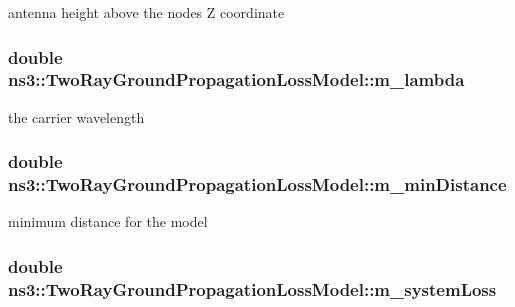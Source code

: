 antenna height above the node\textquotesingle{}s Z coordinate 

\subsubsection[{\texorpdfstring{m\+\_\+lambda}{m_lambda}}]{\setlength{\rightskip}{0pt plus 5cm}double ns3\+::\+Two\+Ray\+Ground\+Propagation\+Loss\+Model\+::m\+\_\+lambda\hspace{0.3cm}{\ttfamily [private]}}\hypertarget{classns3_1_1TwoRayGroundPropagationLossModel_af726ad6c9f16a5bd5d99db02be47fd78}{}\label{classns3_1_1TwoRayGroundPropagationLossModel_af726ad6c9f16a5bd5d99db02be47fd78}


the carrier wavelength 

\subsubsection[{\texorpdfstring{m\+\_\+min\+Distance}{m_minDistance}}]{\setlength{\rightskip}{0pt plus 5cm}double ns3\+::\+Two\+Ray\+Ground\+Propagation\+Loss\+Model\+::m\+\_\+min\+Distance\hspace{0.3cm}{\ttfamily [private]}}\hypertarget{classns3_1_1TwoRayGroundPropagationLossModel_a2afd2fcfb186242e2fe2d6ef85240498}{}\label{classns3_1_1TwoRayGroundPropagationLossModel_a2afd2fcfb186242e2fe2d6ef85240498}


minimum distance for the model 

\subsubsection[{\texorpdfstring{m\+\_\+system\+Loss}{m_systemLoss}}]{\setlength{\rightskip}{0pt plus 5cm}double ns3\+::\+Two\+Ray\+Ground\+Propagation\+Loss\+Model\+::m\+\_\+system\+Loss\hspace{0.3cm}{\ttfamily [private]}}\hypertarget{classns3_1_1TwoRayGroundPropagationLossModel_a944fc5bdc91fb21e200374a5f415d826}{}\label{classns3_1_1TwoRayGroundPropagationLossModel_a944fc5bdc91fb21e200374a5f415d826}


